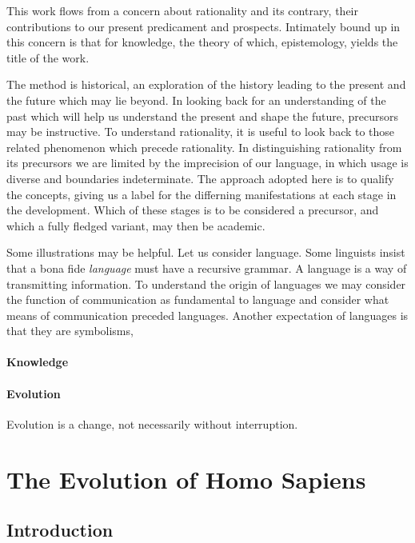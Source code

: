 \documentclass[10pt,titlepage]{book}
\begin{document}
This work flows from a concern about rationality and its contrary, their contributions to our present predicament and prospects.
Intimately bound up in this concern is that for knowledge, the theory of which, epistemology, yields the title of the work.

The method is historical, an exploration of the history leading to the present and the future which may lie beyond.
In looking back for an understanding of the past which will help us understand the present and shape the future, precursors may be instructive.
To understand rationality, it is useful to look back to those related phenomenon which precede rationality.
In distinguishing rationality from its precursors we are limited by the imprecision of our language, in which usage is diverse and boundaries indeterminate.
The approach adopted here is to qualify the concepts, giving us a label for the differning manifestations at each stage in the development.
Which of these stages is to be considered a precursor, and which a fully fledged variant, may then be academic.

Some illustrations may be helpful.
Let us consider language.
Some linguists insist that a bona fide \emph{language} must have a recursive grammar.
A language is a way of transmitting information.
To understand the origin of languages we may consider the function of communication as fundamental to language and consider what means of communication preceded languages.
Another expectation of languages is that they are symbolisms, 


\subsection{Knowledge}


\subsection{Evolution}

Evolution is a change, not necessarily without interruption.







\part{The Evolution of Homo Sapiens}

\chapter{Introduction}
\end{document}
